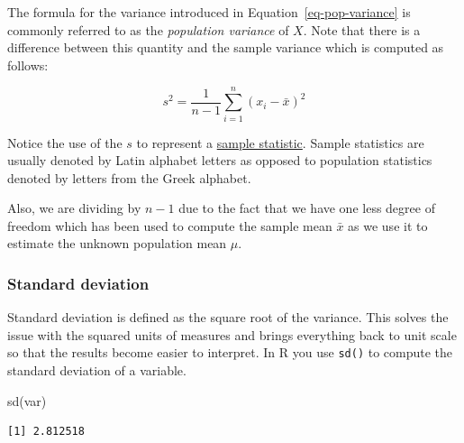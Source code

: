 \documentclass[
  letterpaper,
  DIV=11,
  numbers=noendperiod]{scrartcl}
\newenvironment{Shaded}{\begin{snugshade}}{\end{snugshade}}
\newcommand{\FunctionTok}[1]{\textcolor[rgb]{0.28,0.35,0.67}{#1}}
\newcommand{\NormalTok}[1]{\textcolor[rgb]{0.00,0.23,0.31}{#1}}
\begin{document}
\begin{tcolorbox}[enhanced jigsaw, bottomtitle=1mm, bottomrule=.15mm, opacitybacktitle=0.6, leftrule=.75mm, title=\textcolor{quarto-callout-note-color}{\faInfo}\hspace{0.5em}{Note}, colback=white, coltitle=black, colframe=quarto-callout-note-color-frame, opacityback=0, colbacktitle=quarto-callout-note-color!10!white, breakable, rightrule=.15mm, toptitle=1mm, titlerule=0mm, arc=.35mm, toprule=.15mm, left=2mm]

The formula for the variance introduced in
Equation~\ref{eq-pop-variance} is commonly referred to as the
\emph{population variance} of \(X\). Note that there is a difference
between this quantity and the sample variance which is computed as
follows:

\[
s^2 = \frac{1}{n-1} \sum_{i=1}^n (x_i - \bar{x})^2
\]

Notice the use of the \(s\) to represent a
\href{https://www.sciencedirect.com/topics/mathematics/sample-statistic}{sample
statistic}. Sample statistics are usually denoted by Latin alphabet
letters as opposed to population statistics denoted by letters from the
Greek alphabet.

Also, we are dividing by \(n-1\) due to the fact that we have one less
degree of freedom which has been used to compute the sample mean
\(\bar{x}\) as we use it to estimate the unknown population mean
\(\mu\).

\end{tcolorbox}

\subsubsection{Standard deviation}\label{standard-deviation}

Standard deviation is defined as the square root of the variance. This
solves the issue with the squared units of measures and brings
everything back to unit scale so that the results become easier to
interpret. In R you use \texttt{sd()} to compute the standard deviation
of a variable.

\begin{Shaded}
\begin{Highlighting}[]
\FunctionTok{sd}\NormalTok{(var)}
\end{Highlighting}
\end{Shaded}

\begin{verbatim}
[1] 2.812518
\end{verbatim}
\end{document}
